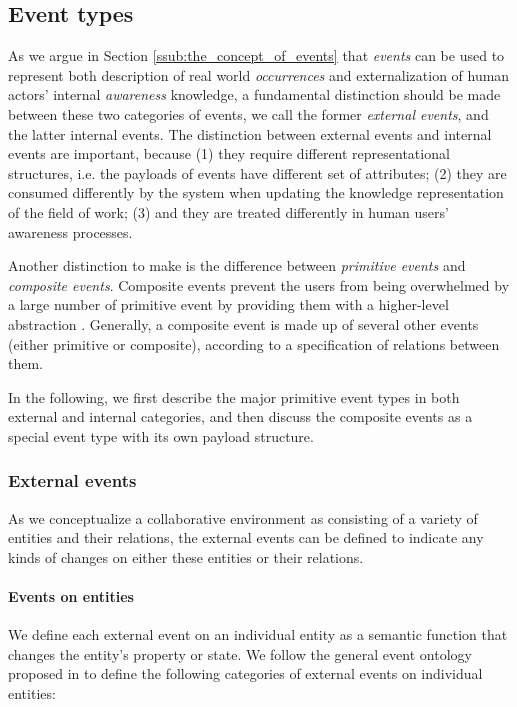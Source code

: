 \subsection{Event types} %
\label{sub:event_types}
As we argue in Section \ref{ssub:the_concept_of_events} that \emph{events} can be used to represent both description of real world \emph{occurrences} and externalization of human actors' internal \emph{awareness} knowledge, a fundamental distinction should be made between these two categories of events, we call the former \emph{external events}, and the latter {internal events}. The distinction between external events and internal events are important, because (1) they require different representational structures, i.e. the payloads of events have different set of attributes; (2) they are consumed differently by the system when updating the knowledge representation of the field of work; (3) and they are treated differently in  human users' awareness processes. 

Another distinction to make is the difference between \emph{primitive events} and \emph{composite events}. Composite events prevent the users from being overwhelmed by a large number of primitive event by providing them with a higher-level abstraction \cite{Mhl2010}. Generally, a composite event is made up of several other events (either primitive or composite), according to a specification of relations between them. 

In the following, we first describe the major primitive event types in both external and internal categories, and then discuss the composite events as a special event type with its own payload structure.

\subsubsection{External events} %
\label{ssub:external_events}
As we conceptualize a collaborative environment as consisting of a variety of entities and their relations, the external events can be defined to indicate any kinds of changes on either these entities or their relations. 

\paragraph*{Events on entities} %
\label{par:events_on_entities_}
We define each external event on an individual entity as a semantic function that changes the entity's property or state. We follow the general event ontology proposed in \cite{Kaneiwa2007} to define the following categories of external events on individual entities:

